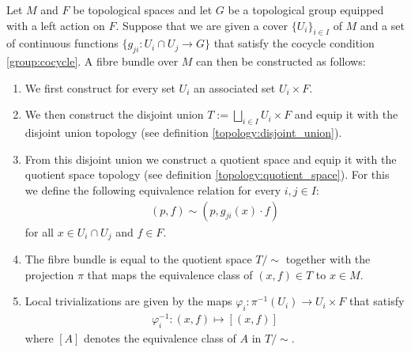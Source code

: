     \begin{construct}\label{manifolds:theorem:fibre_bundle_construction_theorem}
        Let $M$ and $F$ be topological spaces and let $G$ be a topological group equipped with a left action on $F$. Suppose that we are given a cover $\{U_i\}_{i\in I}$ of $M$ and a set of continuous functions $\{g_{ji}:U_i\cap U_j\rightarrow G\}$ that satisfy the cocycle condition \ref{group:cocycle}. A fibre bundle over $M$ can then be constructed as follows:
        \begin{enumerate}
            \item We first construct for every set $U_i$ an associated set $U_i\times F$.
            \item We then construct the disjoint union $T:=\bigsqcup_{i\in I}U_i\times F$ and equip it with the disjoint union topology (see definition \ref{topology:disjoint_union}).
            \item From this disjoint union we construct a quotient space and equip it with the quotient space topology (see definition \ref{topology:quotient_space}). For this we define the following equivalence relation for every $i, j\in I$:
                \begin{gather}
                    (p, f)\sim(p, g_{ji}(x)\cdot f)
                \end{gather}
                for all $x\in U_i\cap U_j$ and $f\in F$.
            \item The fibre bundle is equal to the quotient space $T/\sim$ together with the projection $\pi$ that maps the equivalence class of $(x, f)\in T$ to $x\in M$.
            \item Local trivializations are given by the maps $\varphi_i:\pi^{-1}(U_i)\rightarrow U_i\times F$ that satisfy
                \begin{gather}
                    \varphi_i^{-1}:(x, f)\mapsto [(x, f)]
                \end{gather}
                where $[A]$ denotes the equivalence class of $A$ in $T/\sim$.
        \end{enumerate}
    \end{construct}


